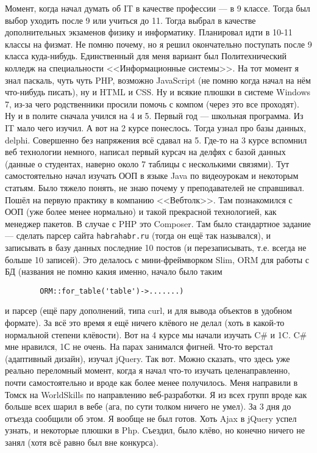 \documentclass[14pt,a4paper,oneside]{extbook}
\begin{document}
		Момент, когда начал думать об IT в качестве профессии --- в 9 классе. Тогда был выбор уходить после 9 или учиться до 11. Тогда выбрал в качестве дополнительных экзаменов физику и информатику.
		Планировал идти в 10-11 классы на физмат. Не помню почему, но я решил окончательно поступать после 9 класса куда-нибудь. Единственный для меня вариант был Политехнический колледж на специальности <<Информационные системы>>.
		На тот момент я знал паскаль, чуть чуть PHP, возможно JavaScript (не помню когда начал на нём что-нибудь писать), ну и HTML и CSS. Ну и всякие плюшки в системе Windows 7, из-за чего родственники просили помочь с компом (через это все проходят).
		Ну и в полите сначала учился на 4 и 5. Первый год --- школьная программа. Из IT мало чего изучил. А вот на 2 курсе понеслось. Тогда узнал про базы данных, delphi.
		Совершенно без напряжения всё сдавал на 5. Где-то на 3 курсе вспомнил веб технологии немного, написал первый курсач на делфях с базой данных (данные о студентах, наверно около 7 таблицы с несколькими связями).
		Тут самостоятельно начал изучать ООП в языке Java по видеоурокам и некоторым статьям. Было тяжело понять, не знаю почему у преподавателей не справшивал.
		Пошёл на первую практику в компанию <<Вебтолк>>. Там познакомился с ООП (уже более менее нормально) и такой прекрасной технологией, как менеджер пакетов. В случае с PHP это Composer.
		Там было стандартное задание --- сделать парсер сайта \verb|habrahabr.ru| (тогда он ещё так назывался), и записывать в базу данных последние 10 постов (и перезаписывать, т.е. всегда не больше 10 записей).
		Это делалось с мини-фреймворком Slim, ORM для работы с БД (названия не помню какия именно, начало было таким
		\begin{verbatim}
		ORM::for_table('table')->.......)
		\end{verbatim}
		и парсер (ещё пару дополнений, типа curl, и для вывода объектов в удобном формате).
		За всё это время я ещё ничего клёвого не делал (хоть в какой-то нормальной степени клёвости).
		Вот на 4 курсе мы начали изучать C\# и 1C. C\# мне нравился, 1С не очень. На парах занимался фигней. Что-то верстал (адаптивный дизайн), изучал jQuery.
		Так вот. Можно сказать, что здесь уже реально переломный момент, когда я начал что-то изучать целенаправленно, почти самостоятельно и вроде как более менее получилось.
		Меня направили в Томск на WorldSkills по направлению веб-разработки. Я из всех групп вроде как больше всех шарил в вебе (ага, по сути толком ничего не умел). 
		За 3 дня до отъезда сообщили об этом. Я вообще не был готов. Хоть Ajax в jQuery успел узнать, и некоторые плюшки в Php. Съездил, было клёво, но конечно ничего не занял (хотя всё равно был вне конкурса).
\end{document}
